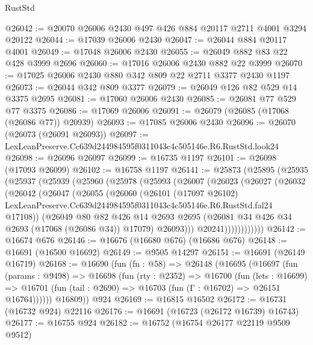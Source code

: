 \begin{lexlean}{RustStd}
\begin{coremodule}
@26042 := @20070 @26006 @2430 @497 @426 @884 @20117 @2711 @4001 @3294 @20122
@26044 := @17039 @26006 @2430
@26047 := @26044 @884 @20117 @4001
@26049 := @17048 @26006 @2430
@26055 := @26049 @882 @83 @22 @428 @3999 @2696
@26060 := @17016 @26006 @2430 @882 @22 @3999
@26070 := @17025 @26006 @2430 @880 @342 @809 @22 @2711 @3377 @2430 @1197
@26073 := @26044 @342 @809 @3377
@26079 := @26049 @126 @82 @529 @14 @3375 @2695
@26081 := @17060 @26006 @2430
@26085 := @26081 @77 @529 @77 @3375
@26086 := @17069 @26006
@26091 := @26079 (@26085 (@17068 (@26086 @77)) @20939)
@26093 := @17085 @26006 @2430
@26096 := @26070 (@26073 (@26091 @26093))
@26097 := LexLeanPreserve.Cc639d244984595f0311043c4c505146e.R6.RustStd.look24
@26098 := @26096 @26097
@26099 := @16735 @1197
@26101 := @26098 (@17093 @26099)
@26102 := @16758 @1197
@26141 := @25873
    (@25895
      (@25935
        (@25937
          (@25939
            (@25960
              (@25978
                (@25993
                  (@26007
                    (@26023
                      (@26027
                        (@26032
                          (@26042
                            (@26047
                              (@26055
                                (@26060
                                  (@26101
                                    (@17097 @26102)
                                    LexLeanPreserve.Cc639d244984595f0311043c4c505146e.R6.RustStd.fal24
                                    @17108))
                                (@26049
                                  @80
                                  @82
                                  @426
                                  @14
                                  @2693
                                  @2695
                                  (@26081 @34 @426 @34 @2693 (@17068 (@26086 @34)) @17079)
                                  @26093)))
                            @20241))))))))))))
@26142 := @16674 @676
@26146 := @16676 (@16680 @676) (@16686 @676)
@26148 := @16691 (@16500 @16692)
@26149 := @9505 @14297
@26151 := @16691 (@26149 @16719)
@26168 := @16690
    (fun (fn : @58) =>
    @26148
      (@16695
        (@16697
          (fun (params : @9498) =>
          @16698
            (fun (rty : @2352) =>
            @16700
              (fun (lets : @16699) =>
              @16701 (fun (tail : @2690) => @16703 (fun (Γ : @16702) => @26151 @16764))))))
        @16809))
    @924
@26169 := @16815 @16502
@26172 := @16731 (@16732 @924) @22116
@26176 := @16691 (@16723 (@26172 @16739) @16743)
@26177 := @16755 @924
@26182 := @16752 (@16754 @26177 @22119 @9509 @9512)

\end{coremodule}
\end{lexlean}
